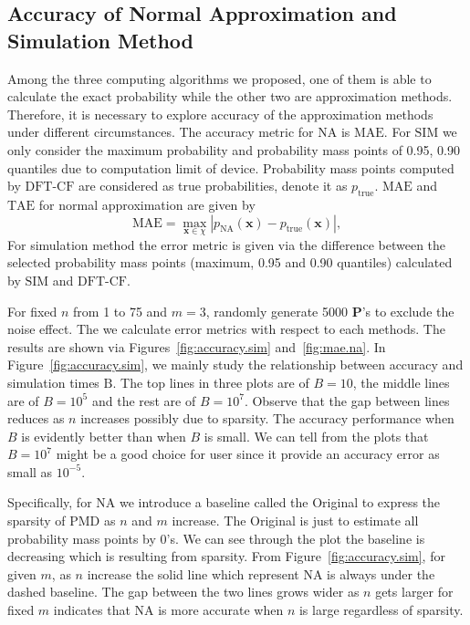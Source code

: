 \documentclass[12pt]{article}
\newcommand{\Pmat}{\mathbf{P}}
\newcommand{\TAE}{{\textrm{TAE}}}
\newcommand{\MAE}{{\textrm{MAE}}}
\newcommand{\PMD}{\textrm{PMD}}
\newcommand{\xvec}{\boldsymbol{x}}
\newcommand{\SIM}{{\textrm{SIM}}}
\newcommand{\NA}{{\textrm{NA}}}
\newcommand{\dft}{{\textrm{DFT-CF}}}
\begin{document}
\subsection{Accuracy of Normal Approximation and Simulation Method}
Among the three computing algorithms we proposed, one of them is able to calculate the exact probability while the other two are approximation methods. Therefore, it is necessary to explore accuracy of the approximation methods under different circumstances. The accuracy metric for $\NA$ is $\MAE$. For $\SIM$ we only consider the maximum probability and probability mass points of 0.95, 0.90 quantiles due to computation limit of device. Probability mass points computed by $\dft$ are considered as true probabilities, denote it as $p_{\textrm{true}}$.
$\MAE$ and $\TAE$ for normal approximation are given by
\begin{equation*}
    \MAE = \max_{\xvec \in \chi}|p_{\NA}(\xvec)-p_{\textrm{true}}(\xvec)|,
\end{equation*}
For simulation method the error metric is given via the difference between the selected probability mass points (maximum, 0.95 and 0.90 quantiles) calculated by $\SIM$ and $\dft$.

For fixed $n$ from 1 to 75 and $m=3$, randomly generate 5000 $\Pmat$'s to exclude the noise effect. The we calculate error metrics with respect to each methods. The results are shown via Figures~\ref{fig:accuracy.sim} and~\ref{fig:mae.na}. In Figure~\ref{fig:accuracy.sim}, we mainly study the relationship between accuracy and simulation times $\mbox{B}$. The top lines in three plots are of $B=10$,  the middle lines are of $B=10^5$ and the rest are of $B=10^7$. Observe that the gap between lines reduces as $n$ increases possibly due to sparsity. The accuracy performance when $B$ is evidently better than when $B$ is small. We can tell from the plots that $B=10^7$ might be a good choice for user since it provide an accuracy error as small as $10^{-5}$.


Specifically, for $\NA$ we introduce a baseline called the Original to express the sparsity of $\PMD$ as $n$ and $m$ increase. The Original is just to estimate all probability mass points by 0's. We can see through the plot the baseline is decreasing which is resulting from sparsity. From Figure~\ref{fig:accuracy.sim}, for given $m$, as $n$ increase the solid line which represent $\NA$ is always under the dashed baseline. The gap between the two lines grows wider as $n$ gets larger for fixed $m$ indicates that $\NA$ is more accurate when $n$ is large regardless of sparsity.
\end{document}
